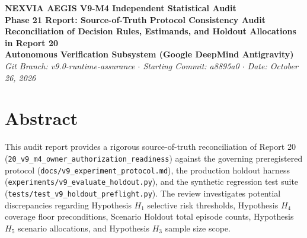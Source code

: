 \documentclass[10pt,a4paper]{article}
\begin{document}
\begin{center}
    {\LARGE \textbf{NEXVIA AEGIS V9-M4 Independent Statistical Audit}}\\[6pt]
    {\Large \textbf{Phase 21 Report: Source-of-Truth Protocol Consistency Audit}}\\[3pt]
    {\large \textbf{Reconciliation of Decision Rules, Estimands, and Holdout Allocations in Report 20}}\\[10pt]
    \textbf{Autonomous Verification Subsystem (Google DeepMind Antigravity)}\\
    \textit{Git Branch: v9.0-runtime-assurance \quad $\cdot$ \quad Starting Commit: a8895a0 \quad $\cdot$ \quad Date: October 26, 2026}\\[12pt]
\end{center}

\noindent{}

\vspace{10pt}

\section*{Abstract}
This audit report provides a rigorous source-of-truth reconciliation of Report 20 (\texttt{20\_v9\_m4\_owner\_authorization\_readiness}) against the governing preregistered protocol (\texttt{docs/v9\_experiment\_protocol.md}), the production holdout harness (\texttt{experiments/v9\_evaluate\_holdout.py}), and the synthetic regression test suite (\texttt{tests/test\_v9\_holdout\_preflight.py}). The review investigates potential discrepancies regarding Hypothesis $H_1$ selective risk thresholds, Hypothesis $H_4$ coverage floor preconditions, Scenario Holdout total episode counts, Hypothesis $H_5$ scenario allocations, and Hypothesis $H_3$ sample size scope. 
\end{document}
